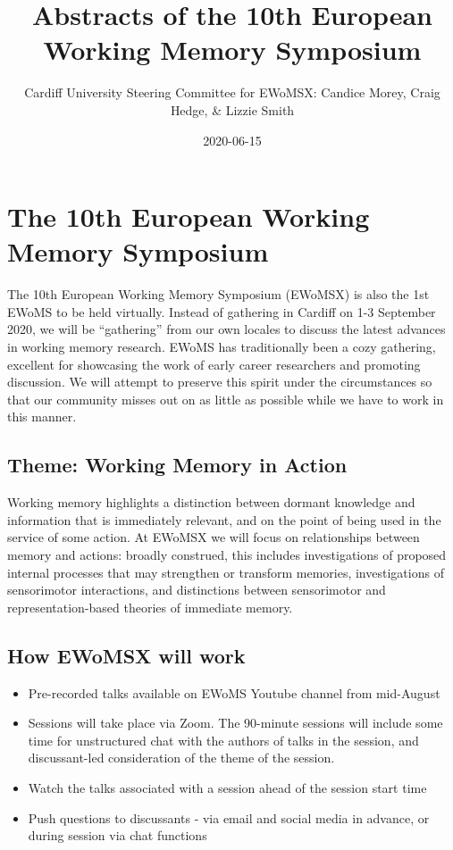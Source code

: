 \documentclass[
  12pt,
]{book}
\title{Abstracts of the 10th European Working Memory Symposium}
\author{Cardiff University Steering Committee for EWoMSX: Candice Morey, Craig Hedge, \& Lizzie Smith}
\date{2020-06-15}
\begin{document}
\maketitle

{
\setcounter{tocdepth}{1}
\tableofcontents
}
\hypertarget{the-10th-european-working-memory-symposium}{%
\chapter{The 10th European Working Memory Symposium}\label{the-10th-european-working-memory-symposium}}

The 10th European Working Memory Symposium (EWoMSX) is also the 1st EWoMS to be held virtually. Instead of gathering in Cardiff on 1-3 September 2020, we will be ``gathering'' from our own locales to discuss the latest advances in working memory research. EWoMS has traditionally been a cozy gathering, excellent for showcasing the work of early career researchers and promoting discussion. We will attempt to preserve this spirit under the circumstances so that our community misses out on as little as possible while we have to work in this manner.

\hypertarget{theme-working-memory-in-action}{%
\section{Theme: Working Memory in Action}\label{theme-working-memory-in-action}}

Working memory highlights a distinction between dormant knowledge and information that is immediately relevant, and on the point of being used in the service of some action. At EWoMSX we will focus on relationships between memory and actions: broadly construed, this includes investigations of proposed internal processes that may strengthen or transform memories, investigations of sensorimotor interactions, and distinctions between sensorimotor and representation-based theories of immediate memory.

\hypertarget{how-ewomsx-will-work}{%
\section{How EWoMSX will work}\label{how-ewomsx-will-work}}

\begin{itemize}
\item
  Pre-recorded talks available on EWoMS Youtube channel from mid-August
\item
  Sessions will take place via Zoom. The 90-minute sessions will include some time for unstructured chat with the authors of talks in the session, and discussant-led consideration of the theme of the session.
\item
  Watch the talks associated with a session ahead of the session start time
\item
  Push questions to discussants - via email and social media in advance, or during session via chat functions
\end{itemize}
\end{document}
